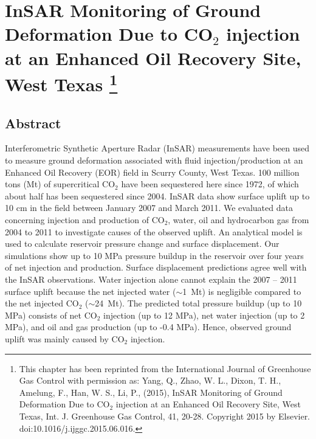 \chapter[InSAR Monitoring of Ground Deformation Due to CO$_{2}$ injection at an Enhanced Oil Recovery Site, West Texas]{InSAR Monitoring of Ground Deformation Due to CO$_{2}$ injection at an Enhanced Oil Recovery Site, West Texas \footnote{This chapter has been reprinted from the International Journal of Greenhouse Gas Control with permission as: Yang, Q., Zhao, W. L., Dixon, T. H., Amelung, F., Han, W. S., Li, P., (2015), InSAR Monitoring of Ground Deformation Due to CO$_{2}$ injection at an Enhanced Oil Recovery Site, West Texas, Int. J. Greenhouse Gas Control, 41, 20-28. Copyright 2015 by Elsevier. doi:10.1016/j.ijggc.2015.06.016.}}

% 
% 

\section{Abstract} 
Interferometric Synthetic Aperture Radar (InSAR) measurements have been used to measure ground deformation associated with fluid injection/production at an Enhanced Oil Recovery (EOR) field in Scurry County, West Texas. 100 million tons (Mt) of supercritical CO$_{2}$ have been sequestered here since 1972, of which about half has been sequestered since 2004.  InSAR data show surface uplift up to 10 cm in the field between January 2007 and March 2011.  We evaluated data concerning injection and production of CO$_{2}$, water, oil and hydrocarbon gas from 2004 to 2011 to investigate causes of the observed uplift.  An analytical model is used to calculate reservoir pressure change and surface displacement.  Our simulations show up to 10 MPa pressure buildup in the reservoir over four years of net injection and production.  Surface displacement predictions agree well with the InSAR observations.  Water injection alone cannot explain the 2007 – 2011 surface uplift because the net injected water ($\sim$1~Mt) is negligible compared to the net injected CO$_{2}$ ($\sim$24~Mt).  The predicted total pressure buildup (up to 10 MPa) consists of net CO$_{2}$ injection (up to 12 MPa), net water injection (up to 2 MPa), and oil and gas production (up to -0.4 MPa).  Hence, observed ground uplift was mainly caused by CO$_{2}$ injection.


